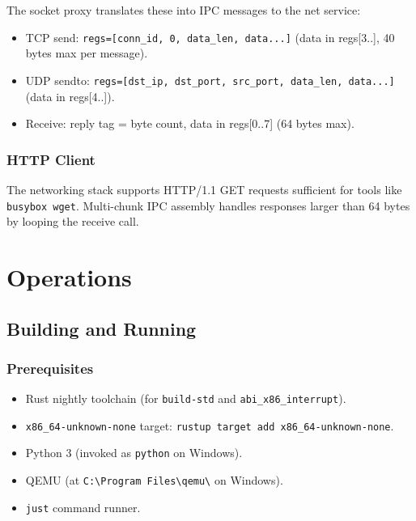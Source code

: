 \documentclass[11pt,a4paper,twoside]{report}
\theoremstyle{definition}
\begin{document}
The socket proxy translates these into IPC messages to the net service:
\begin{itemize}[leftmargin=1.4em]
  \item TCP send: \texttt{regs=[conn\_id, 0, data\_len, data...]} (data
    in regs[3..], 40 bytes max per message).
  \item UDP sendto: \texttt{regs=[dst\_ip, dst\_port, src\_port, data\_len,
    data...]} (data in regs[4..]).
  \item Receive: reply tag = byte count, data in regs[0..7] (64 bytes max).
\end{itemize}

\section{HTTP Client}

The networking stack supports HTTP/1.1 GET requests sufficient for tools
like \texttt{busybox wget}. Multi-chunk IPC assembly handles responses
larger than 64 bytes by looping the receive call.


\part{Operations}

\chapter{Building and Running}
\label{ch:build}

\section{Prerequisites}

\begin{itemize}[leftmargin=1.4em]
  \item Rust nightly toolchain (for \texttt{build-std} and
    \texttt{abi\_x86\_interrupt}).
  \item \texttt{x86\_64-unknown-none} target:
    \texttt{rustup target add x86\_64-unknown-none}.
  \item Python 3 (invoked as \texttt{python} on Windows).
  \item QEMU (at \texttt{C:\textbackslash Program Files\textbackslash qemu\textbackslash}
    on Windows).
  \item \texttt{just} command runner.
\end{itemize}
\end{document}
